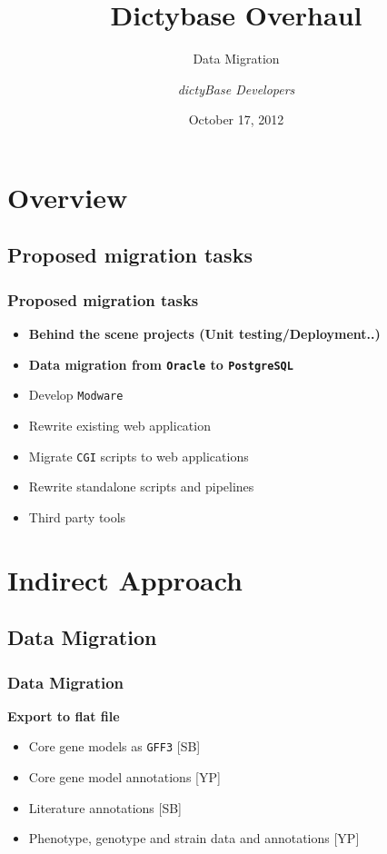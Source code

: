 \documentclass[hyperref={pdfpagelabels=false}, compress]{beamer}
\title{\textbf{Dictybase Overhaul}}
\subtitle{Data Migration}
\author{\textit{dictyBase Developers}}
\date{October 17, 2012}
\begin{document}
\frame{\titlepage}



\section{Overview}

\subsection{Proposed migration tasks}
\begin{frame}
	\frametitle{Proposed migration tasks}
	
    	\begin{itemize}
    	\item \textbf{Behind the scene projects (Unit testing/Deployment..)}
		\item \textbf{Data migration from \texttt{Oracle} to \texttt{PostgreSQL}}
		\vspace{0.5cm}
    		\item Develop \texttt{Modware}
    		\item Rewrite existing web application
    		\item Migrate \texttt{CGI} scripts to web applications 
    		\item Rewrite standalone scripts and pipelines
    		\item Third party tools
	\end{itemize}
\end{frame}




\section{Indirect Approach}

\subsection{Data Migration}
\begin{frame}
    \frametitle{Data Migration} 
	\textbf{\Large Export to flat file}
	\begin{itemize}
		\item Core gene models as \texttt{GFF3} [SB]
		\item Core gene model annotations [YP]
		\item Literature annotations [SB]
		\item Phenotype, genotype and strain data and annotations [YP]
	\end{itemize}
        
\end{frame}
\end{document}
